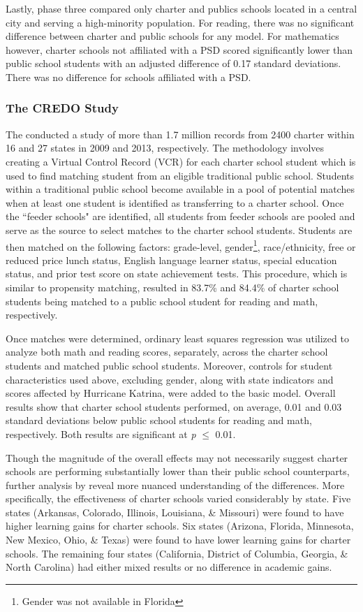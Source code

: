 \documentclass[letterpaper,12p,twoside]{article} %
\begin{document}
Lastly, phase three compared only charter and publics schools located in a central city and serving a high-minority population. For reading, there was no significant difference between charter and public schools for any model. For mathematics however, charter schools not affiliated with a PSD scored significantly lower than public school students with an adjusted difference of 0.17 standard deviations. There was no difference for schools affiliated with a PSD.


\subsubsection{The CREDO Study}
The  conducted a study of more than 1.7 million records from 2400 charter within 16 and 27 states in 2009 and 2013, respectively. The methodology involves creating a Virtual Control Record (VCR) for each charter school student \cite<see also,>{AbadieDiamondHainueller2007,nea} which is used to find matching student from an eligible traditional public school. Students within a traditional public school become available in a pool of potential matches when at least one student is identified as transferring to a charter school. Once the ``feeder schools" are identified, all students from feeder schools are pooled and serve as the source to select matches to the charter school students. Students are then matched on the following factors: grade-level, gender\footnote{Gender was not available in Florida}, race/ethnicity, free or reduced price lunch status, English language learner status, special education status, and prior test score on state achievement tests. This procedure, which is similar to propensity matching, resulted in 83.7\% and 84.4\% of charter school students being matched to a public school student for reading and math, respectively.

Once matches were determined, ordinary least squares regression was utilized to analyze both math and reading scores, separately, across the charter school students and matched public school students. Moreover, controls for student characteristics used above, excluding gender, along with state indicators and scores affected by Hurricane Katrina, were added to the basic model. Overall results show that charter school students performed, on average, 0.01 and 0.03 standard deviations below public school students for reading and math, respectively. Both results are significant at \textit{p} $\leq$ 0.01.

Though the magnitude of the overall effects may not necessarily suggest charter schools are performing substantially lower than their public school counterparts, further analysis by  reveal more nuanced understanding of the differences. More specifically, the effectiveness of charter schools varied considerably by state. Five states (Arkansas, Colorado, Illinois, Louisiana, \& Missouri) were found to have higher learning gains for charter schools. Six states (Arizona, Florida, Minnesota, New Mexico, Ohio, \& Texas) were found to have lower learning gains for charter schools. The remaining four states (California, District of Columbia, Georgia, \& North Carolina) had either mixed results or no difference in academic gains. 
\end{document}
